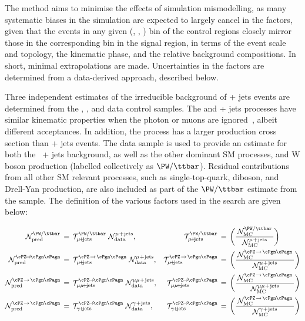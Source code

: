 The method aims to minimise the effects of simulation mismodelling, as
many systematic biases in the simulation are expected to largely
cancel in the \tf factors, given that the events in any given
(\njet, \nb, \scalht) bin of the control regions closely mirror those
in the corresponding bin in the signal region, in terms of the event
scale and topology, the kinematic phase, and the relative background
compositions. In short, minimal extrapolations are made. Uncertainties
in the \tf factors are determined from a data-derived approach,
described below.

Three independent estimates of the irreducible background of \znunu +
jets events are determined from the \gj, \mmj, and \mj data control
samples. The \gj and \zmumu + jets processes have similar kinematic
properties when the photon or muons are ignored~\cite{Bern:2011pa},
albeit different acceptances. In addition, the \gj process has a
larger production cross section than \znunu + jets events. The \mj
data sample is used to provide an estimate for both the \znunu\ + jets
background, as well as the other dominant SM processes, \ttbar and W
boson production (labelled collectively as $\PW/\ttbar$). Residual
contributions from all other SM relevant processes, such as
single-top-quark, diboson, and Drell-Yan production, are also included
as part of the $\PW/\ttbar$ estimate from the \mj sample. The
definition of the various \tf factors used in the search are given
below:

\begin{align} 
  \mathcal{N}^\text{\PW/\ttbar}_\text{pred} \, & = \,
  \tf^\text{\PW/\ttbar}_{\mj} \; 
  \mathcal{N}^\text{\mj}_\text{data}, &
  \tf^\text{\PW/\ttbar}_{\mj} \, & = \,
  \bigg( 
  \frac{\,\mathcal{N}^{\PW/\ttbar}_\text{MC}\,}
  {\mathcal{N}^\text{\mj}_\text{MC}}
  \bigg) \\
  \mathcal{N}^{\znunu}_\text{pred} \, & = \,
  \tf^{\text{\znunu}}_{\mj} \; 
  \mathcal{N}^\text{\mj}_\text{data}, &
  \tf^{\text{\znunu}}_{\mj} \, & = \,
  \bigg( 
  \frac{\,\mathcal{N}^\text{\znunu}_\text{MC}\,}
  {\mathcal{N}^\text{\mj}_\text{MC}}
  \bigg) \\
  \mathcal{N}^\text{\znunu}_\text{pred} \, & = \,
  \tf^{\znunu}_{\mmj}  \;
  \mathcal{N}^\text{\mmj}_\text{data}, &
  \tf^{\znunu}_{\mmj}  \, & = \,
  \bigg( 
  \frac{\,\mathcal{N}^\text{\znunu}_\text{MC}\,}
  {\mathcal{N}^\text{\mmj}_\text{MC}}
  \bigg) \\
  \mathcal{N}^\text{\znunu}_\text{pred} \, & = \,
  \tf^{\znunu}_{\gj}  \;
  \mathcal{N}^\text{\gj}_\text{data}, &
  \tf^{\znunu}_{\gj}  \, & = \,
  \bigg( 
  \frac{\,\mathcal{N}^\text{\znunu}_\text{MC}\,}
  {\mathcal{N}^\text{\gj}_\text{MC}}
  \bigg)
\end{align} 


